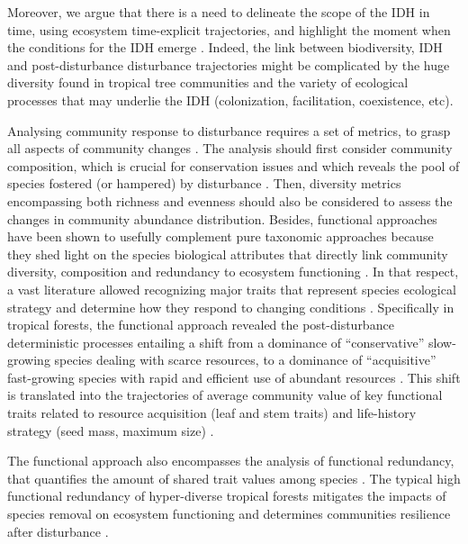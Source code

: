 \documentclass[fleqn,10pt]{ArtEcoFoG} %
\begin{document}
Moreover, we argue that there is a need to delineate the scope of the
IDH in time, using ecosystem time-explicit trajectories, and highlight
the moment when the conditions for the IDH emerge
\citep{Sheil2003, Shea2004}. Indeed, the link between biodiversity, IDH
and post-disturbance disturbance trajectories might be complicated by
the huge diversity found in tropical tree communities and the variety of
ecological processes that may underlie the IDH (colonization,
facilitation, coexistence,
etc)\citep{Lindenmayer2012, Garcia_florez2017}.

Analysing community response to disturbance requires a set of metrics,
to grasp all aspects of community changes
\citep{Sheil2003, Shea2004, Mayfield2010}. The analysis should first
consider community composition, which is crucial for conservation issues
and which reveals the pool of species fostered (or hampered) by
disturbance \citep{Lavorel2002, Bellwood2006}. Then, diversity metrics
encompassing both richness and evenness should also be considered to
assess the changes in community abundance distribution. Besides,
functional approaches have been shown to usefully complement pure
taxonomic approaches because they shed light on the species biological
attributes that directly link community diversity, composition and
redundancy to ecosystem functioning \citep{Violle2007b, Baraloto2012a}.
In that respect, a vast literature allowed recognizing major traits that
represent species ecological strategy and determine how they respond to
changing conditions \citep{Diaz2005}. Specifically in tropical forests,
the functional approach revealed the post-disturbance deterministic
processes entailing a shift from a dominance of ``conservative''
slow-growing species dealing with scarce resources, to a dominance of
``acquisitive'' fast-growing species with rapid and efficient use of
abundant resources \citep{Rees2001, Reich2014, Herault2011}. This shift
is translated into the trajectories of average community value of key
functional traits related to resource acquisition (leaf and stem traits)
and life-history strategy (seed mass, maximum size)
\citep{Wright2004, TerSteege2006, Westoby2006a, Chave2009b}.

The functional approach also encompasses the analysis of functional
redundancy, that quantifies the amount of shared trait values among
species \citep{Carmona2016}. The typical high functional redundancy of
hyper-diverse tropical forests \citep{Bellwood2006} mitigates the
impacts of species removal on ecosystem functioning and determines
communities resilience after disturbance \citep{Elmqvist2003, Diaz2005}.
\end{document}
